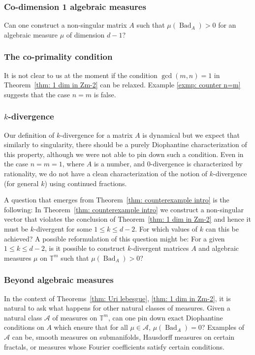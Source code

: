\documentclass[reqno,11pt, twoside]{amsart}
\theoremstyle{plain}
\theoremstyle{definition}
\theoremstyle{definition}
\theoremstyle{remark}
\numberwithin{equation}{section}
\newcommand{\cA}{\mathcal{A}}
\newcommand{\bT}{\mathbb{T}}
\newcommand\on[1]{\operatorname{#1}}
\begin{document}
\subsubsection*{Co-dimension 1 algebraic measures}
Can one construct a non-singular matrix $A$ 
such that $\mu(\on{Bad}_A)>0$ for an algebraic measure $\mu$ of dimension 
$d-1$?

\subsubsection*{The co-primality condition}
It is not clear to us at the moment if the condition $\gcd(m,n)=1$ in
Theorem~\ref{thm: 1 dim in Zm-2} can be relaxed. Example \ref{exmp: counter n=m} suggests that the case $n=m$ is false. 

\subsubsection*{$k$-divergence}
Our definition of $k$-divergence for a matrix $A$ is dynamical 
but we expect that similarly to 
singularity, there should be a purely Diophantine characterization of this property, although we were not able to pin down such a condition. 
Even in the case $n=m=1$, where $A$ is a number, and $0$-divergence is characterized by rationality, we do not have a clean characterization of the notion of $k$-divergence (for general $k$) using continued fractions.  

A question that emerges from Theorem~\ref{thm: counterexample intro} is the following: In Theorem~\ref{thm: counterexample intro} we construct a non-singular vector that violates the conclusion of Theorem~\ref{thm: 1 dim in Zm-2} and hence it must be $k$-divergent for some $1\le k\le d-2$. For which values of $k$ can this be achieved? 
A possible reformulation of this question might be: For a given $1\le k\le d-2$, is it possible to construct 
$k$-divergent matrices $A$ and algebraic measures $\mu$ on $\bT^m$ such that 
$\mu(\on{Bad}_A)>0$?

\subsubsection*{Beyond algebraic measures} 
In the context of Theorems~\ref{thm: Uri lebesgue}, \ref{thm: 1 dim in Zm-2}, 
it is natural to ask what happens for other natural classes of measures. Given a natural class $\cA$ of measures on $\bT^m$, can one pin down exact Diophantine conditions on $A$ which ensure that for all $\mu\in \cA$, 
$\mu(\on{Bad}_A)=0$? Examples of $\cA$ can be, smooth measures on submanifolds, Hausdorff measures on certain fractals, or measures whose Fourier coefficients satisfy certain conditions.
\end{document}
